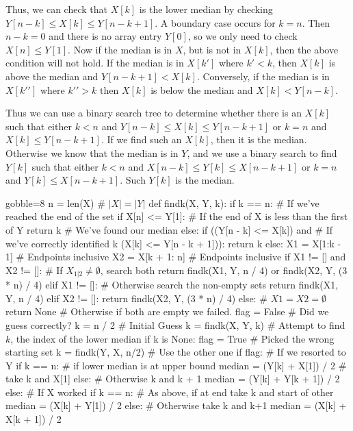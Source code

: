 \documentclass[10pt]{article}
\begin{document}
\begin{easylist}[enumerate]
    Thus, we can check that $X[k]$ is the lower median by checking $Y[n - k] \le X[k] \le Y[n - k + 1]$. A boundary case
    occurs for $k = n$. Then $n - k = 0$ and there is no array entry $Y[0]$, so we only need to check $X[n] \le Y[1]$.
    Now if the median is in $X$, but is not in $X[k]$, then the above condition will not hold. If the median is in
    $X[k\prime]$ where $k\prime < k$, then $X[k]$ is above the median and $Y[n - k + 1] < X[k]$. Conversely, if the
    median is in $X[k\prime\prime]$ where $k\prime\prime > k$ then $X[k]$ is below the median and $X[k] < Y[n -
    k]$.\newline

    Thus we can use a binary search tree to determine whether there is an $X[k]$ such that either $k < n$ and $Y[n - k]
    \le X[k] \le Y[n - k + 1]$ or $k = n$ and $X[k] \le Y[n - k + 1]$. If we find such an $X[k]$, then it is the median.
    Otherwise we know that the median is in $Y$, and we use a binary search to find $Y[k]$ such that either $k < n$ and
    $X[n-k] \le Y[k] \le X[n - k + 1]$ or $k = n$ and $Y[k] \le X[n - k + 1]$. Such $Y[k]$ is the median.

    \begin{pythoncode*}{gobble=8}
        n = len(X) # $|X|=|Y|$
        def findk(X, Y, k):
            if k == n:  # If we've reached the end of the set
                if X[n] <= Y[1]: # If the end of X is less than the first of Y
                    return k  # We've found our median
            else:
                if ((Y[n - k] <= X[k]) and  # If we've correctly identified k
                    (X[k] <= Y[n - k + 1])):
                    return k
                else:
                    X1 = X[1:k - 1]  # Endpoints inclusive
                    X2 = X[k + 1: n] # Endpoints inclusive
                    if X1 != [] and X2 != []: # If $X_{1|2} \neq \emptyset$, search both
                        return findk(X1, Y, n / 4) or findk(X2, Y, (3 * n) / 4)
                    elif X1 != []: # Otherwise search the non-empty sets
                        return findk(X1, Y, n / 4)
                    elif X2 != []:
                        return findk(X2, Y, (3 * n) / 4)
                    else: # $X1=X2=\emptyset$
                        return None   # Otherwise if both are empty we failed.
        flag = False        # Did we guess correctly?
        k = n / 2           # Initial Guess
        k = findk(X, Y, k)  # Attempt to find $k$, the index of the lower median
        if k is None:
            flag = True     # Picked the wrong starting set
            k = findk(Y, X, n/2)  # Use the other one
        if flag:  # If we resorted to Y
            if k == n: # if lower median is at upper bound
                median = (Y[k] + X[1]) / 2 # take k and X[1]
            else: # Otherwise k and k + 1
                median = (Y[k] + Y[k + 1]) / 2
        else:  # If X worked
            if k == n: # As above, if at end take k and start of other
                median = (X[k] + Y[1]) / 2
            else: # Otherwise take k and k+1
                median = (X[k] + X[k + 1]) / 2
    \end{pythoncode*}

\end{easylist}
\end{document}
